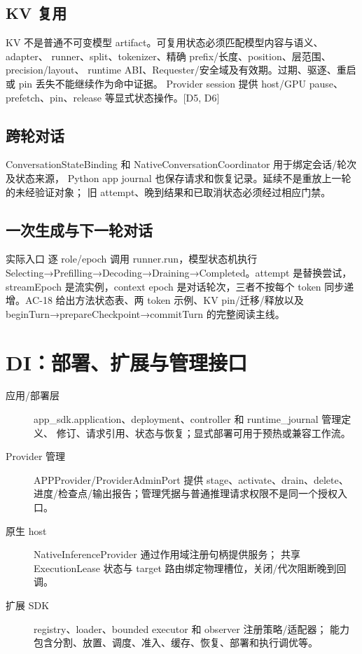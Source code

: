 \subsection{KV 复用}
KV 不是普通不可变模型 artifact。可复用状态必须匹配模型内容与语义、adapter、
runner、split、tokenizer、精确 prefix/长度、position、层范围、precision/layout、
runtime ABI、Requester/安全域及有效期。过期、驱逐、重启或 pin 丢失不能继续作为命中证据。
Provider session 提供 host/GPU pause、prefetch、pin、release 等显式状态操作。[D5, D6]

\subsection{跨轮对话}
ConversationStateBinding 和 NativeConversationCoordinator 用于绑定会话/轮次及状态来源，
Python app journal 也保存请求和恢复记录。延续不是重放上一轮的未经验证对象；
旧 attempt、晚到结果和已取消状态必须经过相应门禁。



\subsection{一次生成与下一轮对话}
实际入口  逐 role/epoch 调用 runner.run，模型状态机执行 Selecting→Prefilling→Decoding→Draining→Completed。attempt 是替换尝试，streamEpoch 是流实例，context epoch 是对话轮次，三者不按每个 token 同步递增。AC-18 给出方法状态表、两 token 示例、KV pin/迁移/释放以及 beginTurn→prepareCheckpoint→commitTurn 的完整阅读主线。

\newpage

\section{DI：部署、扩展与管理接口}
\begin{description}
\item[应用/部署层] app\_sdk.application、deployment、controller 和 runtime\_journal 管理定义、
修订、请求引用、状态与恢复；显式部署可用于预热或兼容工作流。
\item[Provider 管理] APPProvider/ProviderAdminPort 提供 stage、activate、drain、delete、
进度/检查点/输出报告；管理凭据与普通推理请求权限不是同一个授权入口。
\item[原生 host] NativeInferenceProvider 通过作用域注册句柄提供服务；
共享 ExecutionLease 状态与 target 路由绑定物理槽位，关闭/代次阻断晚到回调。
\item[扩展 SDK] registry、loader、bounded executor 和 observer 注册策略/适配器；
能力包含分割、放置、调度、准入、缓存、恢复、部署和执行调优等。
\end{description}

